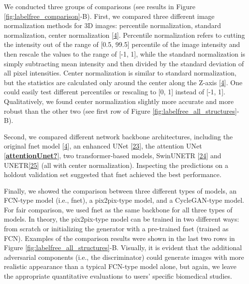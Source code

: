 We conducted three groups of comparisons (see results in Figure \ref{fig:labelfree_comparison}-B). First, we compared three different image normalization methods for 3D images: percentile normalization, standard normalization, center normalization {[}\protect\hyperlink{ref-Yq8wZ6hc}{4}{]}. Percentile normalization refers to cutting the intensity out of the range of {[}0.5, 99.5{]} percentile of the image intensity and then rescale the values to the range of {[}-1, 1{]}, while the standard normalization is simply subtracting mean intensity and then divided by the standard deviation of all pixel intensities. Center normalization is similar to standard normalization, but the statistics are calculated only around the center along the Z-axis {[}\protect\hyperlink{ref-Yq8wZ6hc}{4}{]}. One could easily test different percentiles or rescaling to {[}0, 1{]} instead of {[}-1, 1{]}. Qualitatively, we found center normalization slightly more accurate and more robust than the other two (see first row of Figure \ref{fig:labelfree_all_structures}-B).

Second, we compared different network backbone architectures, including the original fnet model {[}\protect\hyperlink{ref-Yq8wZ6hc}{4}{]}, an enhanced UNet {[}\protect\hyperlink{ref-M7480NLD}{23}{]}, the attention UNet {[}\protect\hyperlink{ref-attentionUnet}{\textbf{attentionUnet?}}{]}, two transformer-based models, SwinUNETR {[}\protect\hyperlink{ref-ZWL3IrVc}{24}{]} and UNETR{[}\protect\hyperlink{ref-XCKUntOB}{25}{]} (all with center normalization). Inspecting the predictions on a holdout validation set suggested that fnet achieved the best performance.

Finally, we showed the comparison between three different types of models, an FCN-type model (i.e., fnet), a pix2pix-type model, and a CycleGAN-type model. For fair comparison, we used fnet as the same backbone for all three types of models. In theory, the pix2pix-type model can be trained in two different ways: from scratch or initializing the generator with a pre-trained fnet (trained as FCN). Examples of the comparison results were shown in the last two rows in Figure \ref{fig:labelfree_all_structures}-B. Visually, it is evident that the additional adversarial components (i.e., the discriminator) could generate images with more realistic appearance than a typical FCN-type model alone, but again, we leave the appropriate quantitative evaluations to users' specific biomedical studies.

